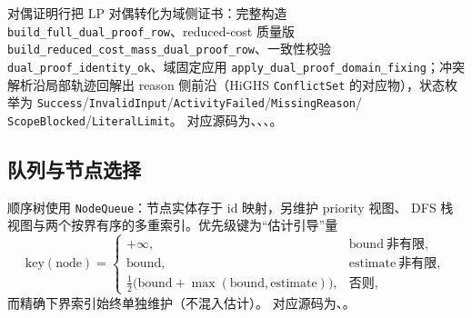 对偶证明行把 LP 对偶转化为域侧证书：完整构造
\texttt{build\_full\_dual\_proof\_row}、reduced-cost 质量版
\texttt{build\_reduced\_cost\_mass\_dual\_proof\_row}、一致性校验
\texttt{dual\_proof\_identity\_ok}、域固定应用
\texttt{apply\_dual\_proof\_domain\_fixing}；冲突解析沿局部轨迹回解出
reason 侧前沿（HiGHS \texttt{ConflictSet} 的对应物），状态枚举为
\texttt{Success}/\texttt{InvalidInput}/\texttt{ActivityFailed}/\texttt{MissingReason}/%
\texttt{ScopeBlocked}/\texttt{LiteralLimit}。
对应源码为、、、。

\subsection{队列与节点选择}\label{subsec:milpbc-queue}

顺序树使用 \texttt{NodeQueue}：节点实体存于 id 映射，另维护 priority 视图、
DFS 栈视图与两个按界有序的多重索引。优先级键为``估计引导''量
\begin{equation}
  \mathrm{key}(\mathrm{node})=
  \begin{cases}
    +\infty, & \mathrm{bound}\ \text{非有限},\\
    \mathrm{bound}, & \mathrm{estimate}\ \text{非有限},\\
    \tfrac12\bigl(\mathrm{bound}+\max(\mathrm{bound},\mathrm{estimate})\bigr),
      & \text{否则},
  \end{cases}
\end{equation}
而精确下界索引始终单独维护（不混入估计）。
对应源码为、。

